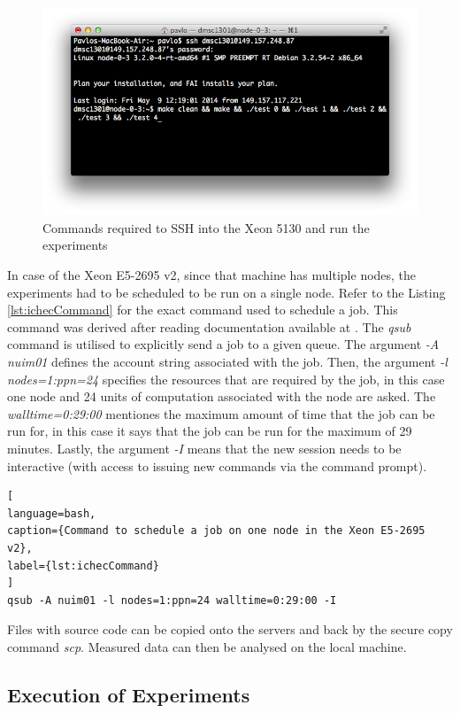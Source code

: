 \begin{figure}[ht!]
\centering
\includegraphics[width=145mm]{5/terminal-nuim.png}
\caption{Commands required to SSH into the Xeon 5130 and run the experiments}
\label{terminal-nuim}
\end{figure}

In case of the Xeon E5-2695 v2, since that machine has multiple nodes, the experiments had to be scheduled to be run on a single node. Refer to the Listing \ref{lst:ichecCommand} for the exact command used to schedule a job. This command was derived after reading documentation available at \cite{ICHEC2014a}. The \textit{qsub} command is utilised to explicitly send a job to a given queue. The argument \textit{-A nuim01} defines the account string associated with the job. Then, the argument \textit{-l nodes=1:ppn=24} specifies the resources that are required by the job, in this case one node and 24 units of computation associated with the node are asked. The \textit{walltime=0:29:00} mentiones the maximum amount of time that the job can be run for, in this case it says that the job can be run for the maximum of 29 minutes. Lastly, the argument \textit{-I} means that the new session needs to be interactive (with access to issuing new commands via the command prompt).
              
\begin{lstlisting}[
language=bash,
caption={Command to schedule a job on one node in the Xeon E5-2695 v2},
label={lst:ichecCommand}
]
qsub -A nuim01 -l nodes=1:ppn=24 walltime=0:29:00 -I
\end{lstlisting}

Files with source code can be copied onto the servers and back by the secure copy command \textit{scp}. Measured data can then be analysed on the local machine.

\subsection{Execution of Experiments}

